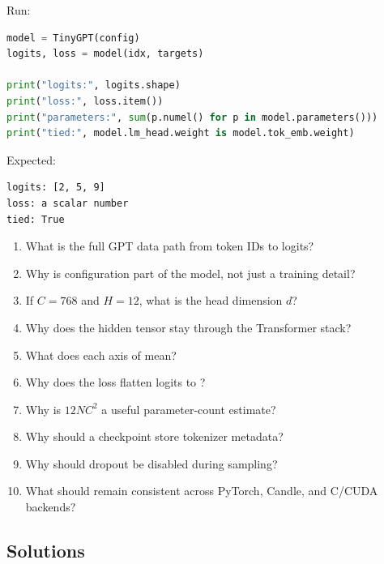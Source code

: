 Run:

\begin{lstlisting}[language=Python]
model = TinyGPT(config)
logits, loss = model(idx, targets)

print("logits:", logits.shape)
print("loss:", loss.item())
print("parameters:", sum(p.numel() for p in model.parameters()))
print("tied:", model.lm_head.weight is model.tok_emb.weight)
\end{lstlisting}

Expected:

\begin{lstlisting}
logits: [2, 5, 9]
loss: a scalar number
tied: True
\end{lstlisting}

\checkpoint

\begin{enumerate}
  \item What is the full GPT data path from token IDs to logits?
  \item Why is configuration part of the model, not just a training detail?
  \item If \(C=768\) and \(H=12\), what is the head dimension \(d\)?
  \item Why does the hidden tensor stay \shape{[B,T,C]} through the Transformer stack?
  \item What does each axis of \shape{[B,T,V]} mean?
  \item Why does the loss flatten logits to \shape{[B*T,V]}?
  \item Why is \(12NC^2\) a useful parameter-count estimate?
  \item Why should a checkpoint store tokenizer metadata?
  \item Why should dropout be disabled during sampling?
  \item What should remain consistent across PyTorch, Candle, and C/CUDA backends?
\end{enumerate}

\subsection*{Solutions}

